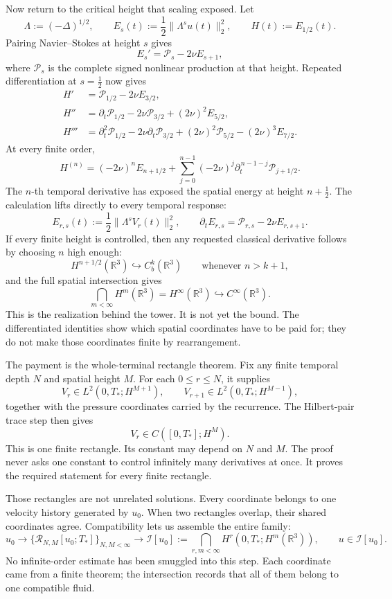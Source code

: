 Now return to the critical height that scaling exposed.  Let
\[
\Lambda:=(-\Delta)^{1/2},
\qquad
E_s(t):=\frac12\|\Lambda^su(t)\|_2^2,
\qquad
H(t):=E_{1/2}(t).
\]
Pairing Navier--Stokes at height \(s\) gives
\[
E_s'=\mathcal P_s-2\nu E_{s+1},
\]
where \(\mathcal P_s\) is the complete signed nonlinear production at that
height.  Repeated differentiation at \(s=\tfrac12\) now gives
\[
\begin{aligned}
H'
&=\mathcal P_{1/2}-2\nu E_{3/2},\\
H''
&=\partial_t\mathcal P_{1/2}
  -2\nu\mathcal P_{3/2}
  +(2\nu)^2E_{5/2},\\
H'''
&=\partial_t^2\mathcal P_{1/2}
  -2\nu\partial_t\mathcal P_{3/2}
  +(2\nu)^2\mathcal P_{5/2}
  -(2\nu)^3E_{7/2}.
\end{aligned}
\]
At every finite order,
\[
H^{(n)}
=(-2\nu)^nE_{n+1/2}
+\sum_{j=0}^{n-1}(-2\nu)^j
 \partial_t^{\,n-1-j}\mathcal P_{j+1/2}.
\]
The \(n\)-th temporal derivative has exposed the spatial energy at height
\(n+\tfrac12\).  The calculation lifts directly to every temporal response:
\[
E_{r,s}(t):=\frac12\|\Lambda^sV_r(t)\|_2^2,
\qquad
\partial_tE_{r,s}
=\mathcal P_{r,s}-2\nu E_{r,s+1}.
\]
If every finite height is controlled, then any requested classical derivative
follows by choosing \(n\) high enough:
\[
H^{n+1/2}(\mathbb R^3)\hookrightarrow C_b^k(\mathbb R^3)
\qquad\text{whenever }n>k+1,
\]
and the full spatial intersection gives
\[
\bigcap_{m<\infty}H^m(\mathbb R^3)
=H^\infty(\mathbb R^3)
\hookrightarrow C^\infty(\mathbb R^3).
\]
This is the realization behind the tower.  It is not yet the bound.  The
differentiated identities show which spatial coordinates have to be paid for;
they do not make those coordinates finite by rearrangement.

The payment is the whole-terminal rectangle theorem.  Fix any finite temporal
depth \(N\) and spatial height \(M\).  For each \(0\le r\le N\), it supplies
\[
V_r\in L^2(0,T_*;H^{M+1}),
\qquad
V_{r+1}\in L^2(0,T_*;H^{M-1}),
\]
together with the pressure coordinates carried by the recurrence.  The
Hilbert-pair trace step then gives
\[
V_r\in C([0,T_*];H^M).
\]
This is one finite rectangle.  Its constant may depend on \(N\) and \(M\).
The proof never asks one constant to control infinitely many derivatives at
once.  It proves the required statement for every finite rectangle.

Those rectangles are not unrelated solutions.  Every coordinate belongs to
one velocity history generated by \(u_0\).  When two rectangles overlap, their
shared coordinates agree.  Compatibility lets us assemble the entire family:
\[
u_0
\longrightarrow
\{\mathcal R_{N,M}[u_0;T_*]\}_{N,M<\infty}
\longrightarrow
\mathcal I[u_0]
:=\bigcap_{r,m<\infty}H^r(0,T_*;H^m(\mathbb R^3)),
\qquad
u\in\mathcal I[u_0].
\]
No infinite-order estimate has been smuggled into this step.  Each coordinate
came from a finite theorem; the intersection records that all of them belong
to one compatible fluid.

